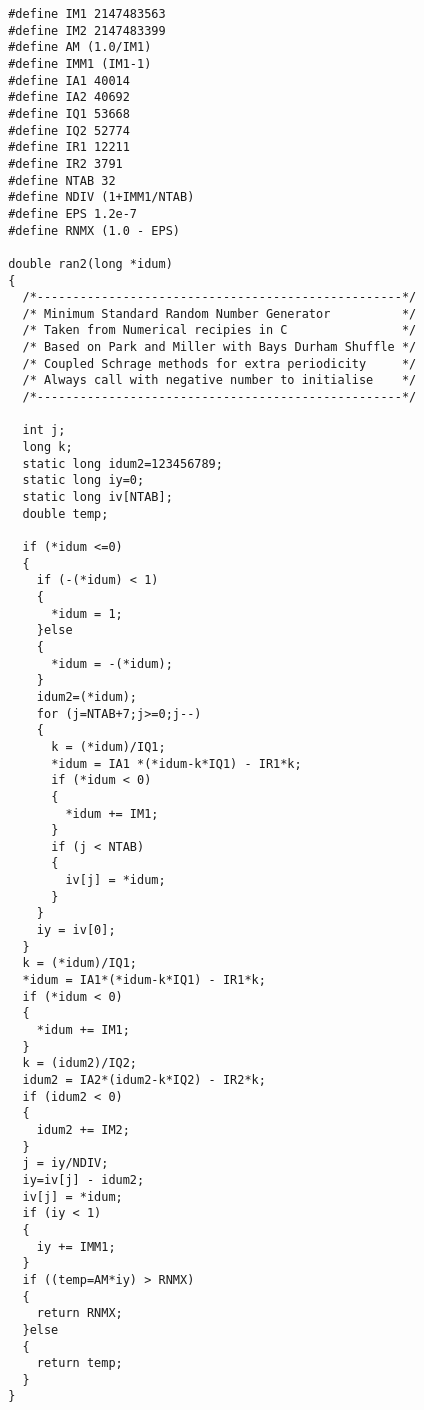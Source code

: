 \begin{verbatim}
 #define IM1 2147483563
 #define IM2 2147483399
 #define AM (1.0/IM1)
 #define IMM1 (IM1-1)
 #define IA1 40014
 #define IA2 40692 
 #define IQ1 53668
 #define IQ2 52774
 #define IR1 12211
 #define IR2 3791
 #define NTAB 32
 #define NDIV (1+IMM1/NTAB)
 #define EPS 1.2e-7
 #define RNMX (1.0 - EPS)
 
 double ran2(long *idum)
 {
   /*---------------------------------------------------*/
   /* Minimum Standard Random Number Generator          */
   /* Taken from Numerical recipies in C                */
   /* Based on Park and Miller with Bays Durham Shuffle */
   /* Coupled Schrage methods for extra periodicity     */
   /* Always call with negative number to initialise    */
   /*---------------------------------------------------*/	
 
   int j;
   long k;
   static long idum2=123456789;
   static long iy=0;
   static long iv[NTAB];
   double temp;
 
   if (*idum <=0)
   {
     if (-(*idum) < 1)
     {
       *idum = 1;
     }else
     {
       *idum = -(*idum);
     }
     idum2=(*idum);
     for (j=NTAB+7;j>=0;j--)
     {
       k = (*idum)/IQ1;
       *idum = IA1 *(*idum-k*IQ1) - IR1*k;
       if (*idum < 0)
       {
         *idum += IM1;
       }
       if (j < NTAB)
       {
         iv[j] = *idum;
       }
     }
     iy = iv[0];	
   }
   k = (*idum)/IQ1;
   *idum = IA1*(*idum-k*IQ1) - IR1*k;
   if (*idum < 0)
   {
     *idum += IM1;
   }
   k = (idum2)/IQ2;
   idum2 = IA2*(idum2-k*IQ2) - IR2*k;
   if (idum2 < 0)
   {
     idum2 += IM2;
   }
   j = iy/NDIV;
   iy=iv[j] - idum2;
   iv[j] = *idum;
   if (iy < 1)
   {
     iy += IMM1;
   }
   if ((temp=AM*iy) > RNMX)
   {
     return RNMX;
   }else
   {
     return temp;	
   }
 }
 
\end{verbatim}

